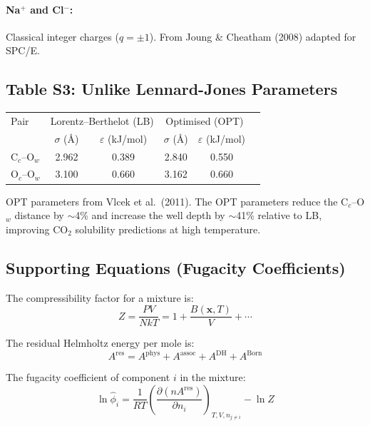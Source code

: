 \documentclass[11pt]{article}
\begin{document}
\paragraph{Na$^+$ and Cl$^-$:} Classical integer charges ($q = \pm1$).
From Joung \& Cheatham (2008) adapted for SPC/E.

\subsection*{Table S3: Unlike Lennard-Jones Parameters}

\begin{center}
\begin{tabular}{lccccc}
\hline
Pair & \multicolumn{2}{c}{Lorentz--Berthelot (LB)} & \multicolumn{2}{c}{Optimised (OPT)} \\
 & $\sigma$ (Å) & $\varepsilon$ (kJ/mol) & $\sigma$ (Å) & $\varepsilon$ (kJ/mol) \\
\hline
C$_c$--O$_w$ & 2.962 & 0.389 & 2.840 & 0.550 \\
O$_c$--O$_w$ & 3.100 & 0.660 & 3.162 & 0.660 \\
\hline
\end{tabular}
\end{center}

\noindent OPT parameters from Vlcek et al.\ (2011). The OPT parameters reduce the C$_c$--O$_w$ distance
by $\sim$4\% and increase the well depth by $\sim$41\% relative to LB, improving CO$_2$ solubility
predictions at high temperature.

\subsection*{Supporting Equations (Fugacity Coefficients)}

The compressibility factor for a mixture is:
\begin{equation}
  Z = \frac{PV}{NkT} = 1 + \frac{B(\mathbf{x},T)}{V} + \cdots
\end{equation}

The residual Helmholtz energy per mole is:
\begin{equation}
  A^\mathrm{res} = A^\mathrm{phys} + A^\mathrm{assoc} + A^\mathrm{DH} + A^\mathrm{Born}
\end{equation}

The fugacity coefficient of component $i$ in the mixture:
\begin{equation}
  \ln \hat{\phi}_i = \frac{1}{RT}\left(\frac{\partial (nA^\mathrm{res})}{\partial n_i}\right)_{T,V,n_{j\neq i}}
    - \ln Z
\end{equation}
\end{document}
